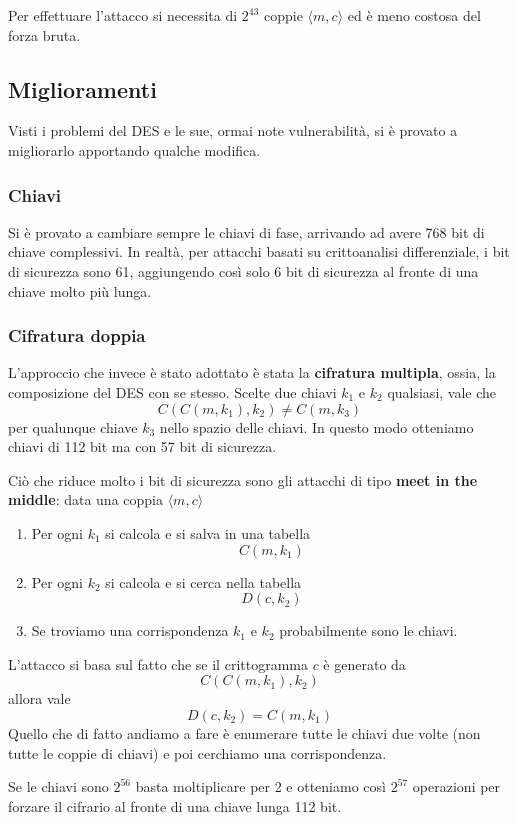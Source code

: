Per effettuare l'attacco si necessita di $2^{43}$ coppie $\langle m, c \rangle$ ed \`e meno costosa del forza bruta.

\subsection{Miglioramenti}\label{miglioramenti_DES}
Visti i problemi del DES e le sue, ormai note vulnerabilit\`a, si \`e provato a migliorarlo apportando qualche modifica.

\subsubsection{Chiavi}
Si \`e provato a cambiare sempre le chiavi di fase, arrivando ad avere 768 bit di chiave complessivi. In realt\`a,
per attacchi basati su crittoanalisi differenziale, i bit di sicurezza sono 61, aggiungendo cos\`i solo 6 bit di
sicurezza al fronte di una chiave molto pi\`u lunga.

\subsubsection{Cifratura doppia}
L'approccio che invece \`e stato adottato \`e stata la \textbf{cifratura multipla}, ossia, la composizione del DES con
se stesso. Scelte due chiavi $k_1$ e $k_2$ qualsiasi, vale che
\[ C(C(m, k_1), k_2) \neq C(m, k_3) \]
per qualunque chiave $k_3$ nello spazio delle chiavi. In questo modo otteniamo chiavi di 112 bit ma con 57 bit di
sicurezza.

Ci\`o che riduce molto i bit di sicurezza sono gli attacchi di tipo \textbf{meet in the middle}: data una coppia
$\langle m, c \rangle$
\begin{enumerate}
	\item Per ogni $k_1$ si calcola e si salva in una tabella
	      \[ C(m, k_1) \]
	\item Per ogni $k_2$ si calcola e si cerca nella tabella
	      \[ D(c, k_2) \]
	\item Se troviamo una corrispondenza $k_1$ e $k_2$ probabilmente sono le chiavi.
\end{enumerate}
L'attacco si basa sul fatto che se il crittogramma $c$ \`e generato da
\[ C(C(m, k_1), k_2) \]
allora vale
\[ D(c, k_2) = C(m, k_1) \]
Quello che di fatto andiamo a fare \`e enumerare tutte le chiavi due volte (non tutte le coppie di chiavi) e poi
cerchiamo una corrispondenza.

Se le chiavi sono $2^{56}$ basta moltiplicare per 2 e otteniamo cos\`i $2^{57}$ operazioni per forzare il cifrario al
fronte di una chiave lunga 112 bit.

